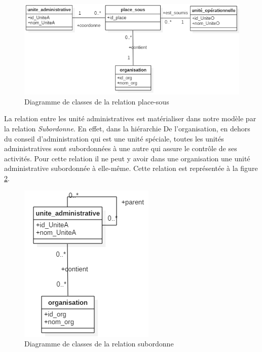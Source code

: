 \begin{figure}[h!]
    \centering
		\includegraphics[scale=0.7]{chap3/images/place-sous.png}
    \caption{Diagramme de classes de la relation place-sous}
	 \label{figplace-sous}
\end{figure} 

\label{sectionUnitéAUniteA}

La relation entre les unité administratives est matérialiser dans  notre modèle par la relation \textit{Subordonne}. En effet, dans la hiérarchie De l'organisation, en dehors du conseil d'administration qui est une unité spéciale, toutes les unités administratives sont  subordonnées à une autre qui assure le contrôle de ses activités. Pour cette relation il ne peut y avoir dans une organisation une unité administrative subordonnée à elle-même. Cette relation est représentée à la figure \ref{figsubordonne}.

\begin{figure}[h!]
    \centering
		\includegraphics[scale=0.7]{chap3/images/subordonne.png}
    \caption{Diagramme de classes de la relation subordonne}
	 \label{figsubordonne}
\end{figure} 

\label{sectionRessourceetVue}

